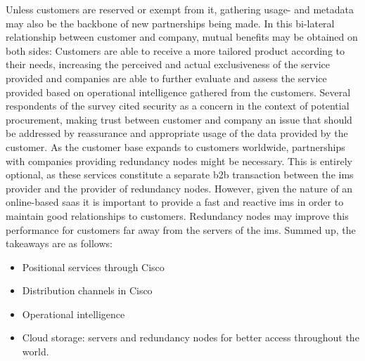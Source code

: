 Unless customers are reserved or exempt from it, gathering usage- and metadata may also be the backbone of new partnerships being made. In this bi-lateral relationship between customer and company, mutual benefits may be obtained on both sides: Customers are able to receive a more tailored product according to their needs, increasing the perceived and actual exclusiveness of the service provided and companies are able to further evaluate and assess the service provided based on operational intelligence gathered from the customers. Several respondents of the survey cited security as a concern in the context of potential procurement, making trust between customer and company an issue that should be addressed by reassurance and appropriate usage of the data provided by the customer. As the customer base expands to customers worldwide, partnerships with companies providing redundancy nodes might be necessary. This is entirely optional, as these services constitute a separate \gls{b2b} transaction between the \gls{ims} provider and the provider of redundancy nodes. However, given the nature of an online-based \gls{saas} it is important to provide a fast and reactive \gls{ims} in order to maintain good relationships to customers. Redundancy nodes may improve this performance for customers far away from the servers of the \gls{ims}. Summed up, the takeaways are as follows: 


\begin{itemize}
    \item Positional services through Cisco
    \item Distribution channels in Cisco
    \item Operational intelligence
    \item Cloud storage: servers and redundancy nodes for better access throughout the world.
\end{itemize}

